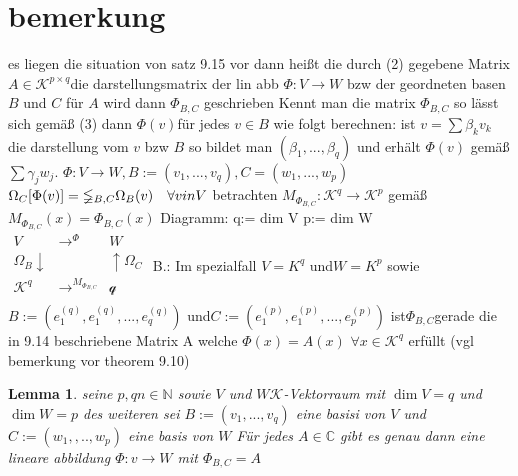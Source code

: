 \documentclass[11pt]{article}
\newtheorem{lemma}[theorem]{Lemma}
\begin{document}
\section{bemerkung}
es liegen die situation von satz 9.15 vor 
dann heißt die durch (2) gegebene Matrix $A \in  \mathcal{K}^{p\times q} $die darstellungsmatrix der lin abb $\Phi :V\rightarrow W$ bzw der geordneten basen $B$ und $C$
für $A$ wird dann $\Phi _{B,C}$ geschrieben
Kennt man die matrix $\Phi _{B,C}$ so lässt sich gemäß (3) dann $\Phi (v) $für jedes $v \in B $ wie folgt berechnen:
ist $v=\sum \beta_kv_k$ die darstellung vom $v$ bzw $B$ so bildet man 
$(\beta_1,..., \beta_q) $ und erhält $\Phi(v)$ gemäß $\sum \gamma_jw_j$.
$\Phi : V \rightarrow W, B:= (v_1,...,v_q) , C=(w_1,...,w_p)$
$\Omega_C[\Phi(v)]=\mathbb{\Phi}_{B,C}\Omega_B(v) \quad \forall v \\in V$
betrachten $M_{\mathbb{\Phi}_{B,C}}: \mathcal{K}^q \rightarrow \mathcal{K}^p$ gemäß $M_{\mathbb{\Phi}_{B,C}}(x)=\mathbb{\Phi}_{B,C}(x)$
Diagramm:
q:= dim V  
p:= dim W
$\begin{matrix}
 V & \rightarrow^\Phi & W\\
 \Omega_B \downarrow & & \uparrow \Omega_C\\
 \mathcal{K}^q & \rightarrow^{M_{\mathbb{\Phi}_{B,C}}} & \mathcal{q}\\
\end{matrix}
$
B.: Im spezialfall $V = K^q$ und$ W= K^p$ sowie$ B:= (e^{(q)}_1,e^{(q)}_1,...,e^{(q)}_q)$ und$ C:= (e^{(p)}_1,e^{(p)}_1,...,e^{(p)}_p)$ 
ist$ \mathbb{\Phi}_{B,C} $gerade die in 9.14 beschriebene Matrix A welche $\Phi(x)=A(x)$ $\forall x \in \mathcal{K}^q$ erfüllt (vgl bemerkung vor theorem 9.10)
\begin{lemma}
 seine $p,q n \in \mathbb{N}$ sowie $V$ und $W \mathcal{K}$-Vektorraum mit $ \dim V=q $ und $\dim W= p$ des weiteren sei $B:=(v_1,...,v_q)$ eine basisi von $V$ und $C:= (w_1,,..,w_p)$ eine basis von $W$ Für jedes $A\in \mathbb{C}$ gibt es genau dann eine lineare abbildung $\Phi:v \rightarrow W$ mit $\mathbb{\Phi}_{B,C}=A$
 
\end{lemma}
\end{document}
